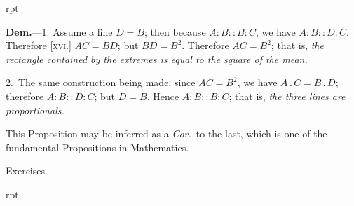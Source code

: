 \documentclass[oneside]{book}
\newcounter{wrapwidth}
\newcommand\exhead[1]{
\Needspace*{5\baselineskip}\begin{center}
\textsf{#1}
\end{center}
}
\newcommand\imgflow[3]{
\setcounter{wrapwidth}{#1}

\begin{wrapfigure}[#2]{r}{\value{wrapwidth}pt}
\begin{center}
\vspace{-0.3in}

\end{center}
\end{wrapfigure}
}
\begin{document}
\imgflow{118}{6}{f189}

\textbf{Dem.}---1. Assume a line $D = B$; then because $A : B
:: B : C$, we have $A : B :: D : C$.
Therefore [\textsc{xvi.}]\label{XVI} $AC = BD$; but
$BD = B^{2}$. Therefore $AC = B^{2}$;
that is, \emph{the rectangle contained
by the extremes is equal to the
square of the mean.}

2.~The same construction being made, since $AC = B^{2}$,
we have $A\,.\,C = B\,.\,D$; therefore $A : B :: D : C$; but
$D = B$. Hence $A : B :: B : C$; that is, \emph{the three lines
are proportionals.}

\smallskip
\begin{footnotesize}
This Proposition may be inferred as a \emph{Cor.}\ to the last, which
is one of the fundamental Propositions in Mathematics.
\par\end{footnotesize}



\exhead{Exercises.}


\imgflow{100}{12}{f190}
\end{document}

